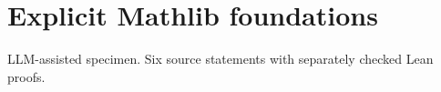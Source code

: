 \documentclass{article}
\begin{document}
\section*{Explicit Mathlib foundations}
LLM-assisted specimen. Six source statements with separately checked Lean proofs.

\end{document}
